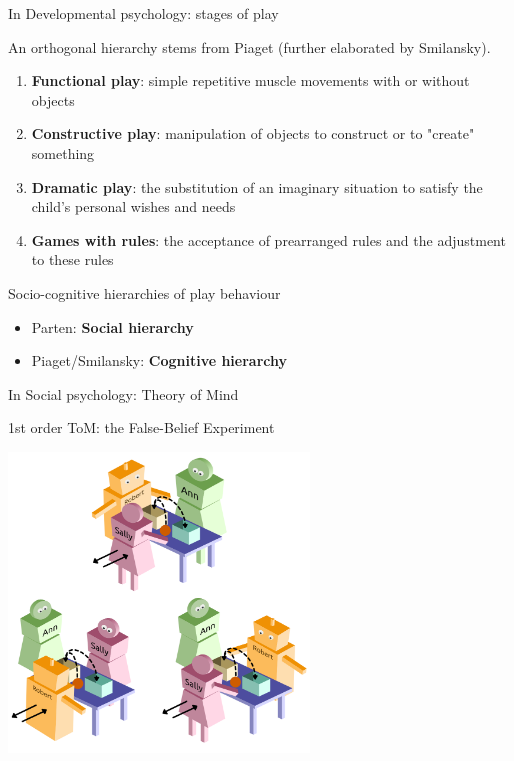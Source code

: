 \documentclass[compress]{beamer}
\begin{document}
{
\begin{frame}{In Developmental psychology: stages of play}

    An orthogonal hierarchy stems from Piaget (further elaborated by
    Smilansky).

    \begin{enumerate}
        \item<1-> {\bf Functional play}: simple repetitive muscle movements with
            or without objects

        \item<2-> {\bf Constructive play}: manipulation of objects to construct
            or to "create" something

        \item<3-> {\bf Dramatic play}: the substitution of an imaginary
            situation to satisfy the child's personal wishes and needs

        \item<4-> {\bf Games with rules}: the acceptance of prearranged rules
            and the adjustment to these rules
    
    \end{enumerate}

\end{frame}
}

\begin{frame}{Socio-cognitive hierarchies of play behaviour}
    \begin{itemize}
        \item Parten: {\bf Social hierarchy}
        \item Piaget/Smilansky: {\bf Cognitive hierarchy}
    \end{itemize}
\end{frame}

{
\begin{frame}{In Social psychology: Theory of Mind}
        
    \centering

    1st order ToM: the False-Belief Experiment

    \includegraphics[width=0.6\textwidth]{triadic_false_beliefs}
\end{frame}
}
\end{document}
